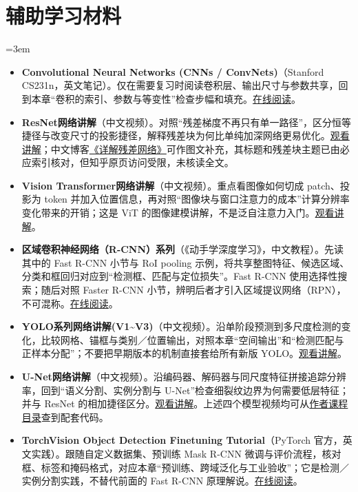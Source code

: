 \section*{辅助学习材料}
\begingroup
\emergencystretch=3em
\begin{itemize}
\item \textbf{Convolutional Neural Networks (CNNs / ConvNets)}（Stanford CS231n，英文笔记）。仅在需要复习时阅读卷积层、输出尺寸与参数共享，回到本章“卷积的索引、参数与等变性”检查步幅和填充。\href{https://cs231n.github.io/convolutional-networks/}{在线阅读}。
\item \textbf{ResNet网络讲解}（中文视频）。对照“残差梯度不再只有单一路径”，区分恒等捷径与改变尺寸的投影捷径，解释残差块为何比单纯加深网络更易优化。\href{https://www.bilibili.com/video/BV1T7411T7wa}{观看讲解}；中文博客\href{https://zhuanlan.zhihu.com/p/42706477}{《详解残差网络》}可作图文补充，其标题和残差块主题已由必应索引核对，但知乎原页访问受限，未核读全文。
\item \textbf{Vision Transformer网络讲解}（中文视频）。重点看图像如何切成 patch、投影为 token 并加入位置信息，再对照“图像块与窗口注意力的成本”计算分辨率变化带来的开销；这是 ViT 的图像建模讲解，不是泛自注意力入门。\href{https://www.bilibili.com/video/BV1Jh411Y7WQ}{观看讲解}。
\item \textbf{区域卷积神经网络（R-CNN）系列}（《动手学深度学习》，中文教程）。先读其中的 Fast R-CNN 小节与 RoI pooling 示例，将共享整图特征、候选区域、分类和框回归对应到“检测框、匹配与定位损失”。Fast R-CNN 使用选择性搜索；随后对照 Faster R-CNN 小节，辨明后者才引入区域提议网络（RPN），不可混称。\href{https://zh.d2l.ai/chapter\_computer-vision/rcnn.html}{在线阅读}。
\item \textbf{YOLO系列网络讲解(V1\textasciitilde V3)}（中文视频）。沿单阶段预测到多尺度检测的变化，比较网格、锚框与类别／位置输出，对照本章“空间输出”和“检测匹配与正样本分配”；不要把早期版本的机制直接套给所有新版 YOLO。\href{https://www.bilibili.com/video/BV1yi4y1g7ro}{观看讲解}。
\item \textbf{U-Net网络讲解}（中文视频）。沿编码器、解码器与同尺度特征拼接追踪分辨率，回到“语义分割、实例分割与 U-Net”检查细裂纹边界为何需要低层特征；并与 ResNet 的相加捷径区分。\href{https://www.bilibili.com/video/BV1Vq4y127fB/}{观看讲解}。上述四个模型视频均可从\href{https://github.com/WZMIAOMIAO/deep-learning-for-image-processing}{作者课程目录}查到配套代码。
\item \textbf{TorchVision Object Detection Finetuning Tutorial}（PyTorch 官方，英文实践）。跟随自定义数据集、预训练 Mask R-CNN 微调与评价流程，核对框、标签和掩码格式，对应本章“预训练、跨域泛化与工业验收”；它是检测／实例分割实践，不替代前面的 Fast R-CNN 原理解说。\href{https://docs.pytorch.org/tutorials/intermediate/torchvision\_tutorial.html}{在线阅读}。
\end{itemize}
\endgroup
